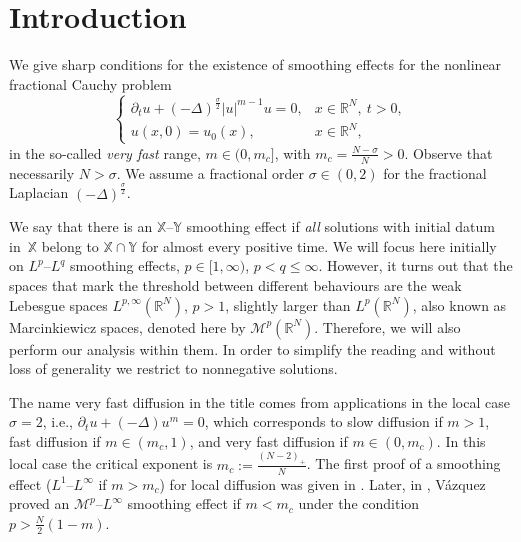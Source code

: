\documentclass[leqno,12pt]{amsart}
\theoremstyle{definition}
\theoremstyle{remark}
\numberwithin{equation}{section}
\begin{document}

\maketitle

\section{Introduction}

We give sharp conditions for the existence of 
smoothing effects
for the nonlinear fractional Cauchy problem
\begin{equation}\label{eq:main}
    \begin{cases}
        \partial_t u+(-\Delta)^{\frac\sigma2}|u|^{m-1}u=0,&x\in \mathbb{R}^N,\ t>0,\\
        u(x,0)=u_0(x),&x\in\mathbb{R}^N,
    \end{cases}
\end{equation}
in the so-called \emph{very fast} range, $m\in (0,m_c]$, with  $m_c=\frac{N-\sigma}{N}>0$. Observe that necessarily $N>\sigma$. We assume a fractional order $\sigma\in(0,2)$ for the fractional Laplacian $(-\Delta)^{\frac\sigma2}$. 

We say that there is an $\mathbb{X}$--$\mathbb{Y}$ smoothing effect if \emph{all} solutions with initial datum in~$\mathbb{X}$  belong to $\mathbb{X}\cap\mathbb{Y}$ for almost every positive time. We will focus here initially on $L^p$--$L^q$ smoothing effects, $p\in[1,\infty)$, $p<q\le\infty$. However, it turns out that the spaces that mark the threshold between different behaviours are the weak Lebesgue spaces $L^{p,\infty}(\mathbb{R}^N)$, $p>1$, slightly larger than $L^p(\mathbb{R}^N)$, also known as Marcinkiewicz spaces, denoted here by $\mathcal{M}^p(\mathbb{R}^N)$. Therefore, we will also perform our analysis within them.  In order to simplify the reading and without loss of generality we restrict to nonnegative solutions.

The name very fast diffusion in the title comes from applications in the local case $\sigma=2$, i.e., $\partial_t u+(-\Delta)u^m=0$, which corresponds to slow diffusion if $m>1$, fast diffusion if $m\in (m_c,1)$, and very fast diffusion if $m\in(0,m_c)$. In this local case the critical exponent is $m_c:=\frac{(N-2)_+}{N}$. The first proof of a smoothing effect ($L^1$--$L^\infty$ if $m>m_c$) for local diffusion was given in \cite{veron:se,benilan:se}.  Later, in \cite{smoothbook}, Vázquez proved an $\mathcal{M}^p$--$L^\infty$ smoothing effect if $m<m_c$ under the condition $p>\frac{N}{2}(1-m)$. 
\end{document}
